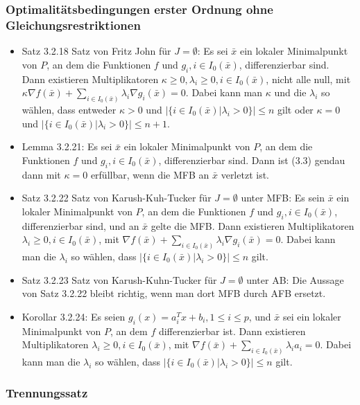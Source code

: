 \documentclass[paper=a4, fontsize=11pt]{scrartcl} %
\numberwithin{equation}{section} %
\numberwithin{figure}{section} %
\numberwithin{table}{section} %
\begin{document}
\subsubsection{Optimalitätsbedingungen erster Ordnung ohne Gleichungsrestriktionen}

\begin{itemize}
  \item Satz 3.2.18 Satz von Fritz John für $J = \emptyset$: Es sei $\bar{x}$ ein lokaler Minimalpunkt von $P$, an dem die Funktionen $f$ und $g_i, i \in I_0(\bar{x})$, differenzierbar sind. Dann existieren Multiplikatoren $\kappa \ge 0, \lambda_i \ge 0, i \in I_0(\bar{x})$, nicht alle null, mit $\kappa \nabla f(\bar{x}) + \sum\limits_{i \in I_0(\bar{x})} \lambda_i \nabla g_i(\bar{x}) = 0$. Dabei kann man $\kappa$ und die $\lambda_i$ so wählen, dass entweder $\kappa > 0$ und $|\{i \in I_0(\bar{x}) | \lambda_i > 0\}| \le n$ gilt oder $\kappa = 0$ und $|\{i \in I_0(\bar{x}) | \lambda_i > 0\}| \le n + 1$.
  \item Lemma 3.2.21: Es sei $\bar{x}$ ein lokaler Minimalpunkt von $P$, an dem die Funktionen $f$ und $g_i, i \in I_0(\bar{x})$, differenzierbar sind. Dann ist (3.3) gendau dann mit $\kappa = 0$ erfüllbar, wenn die MFB an $\bar{x}$ verletzt ist.
  \item Satz 3.2.22 Satz von Karush-Kuh-Tucker für $J = \emptyset$ unter MFB: Es sein $\bar{x}$ ein lokaler Minimalpunkt von $P$, an dem die Funktionen $f$ und $g_i, i \in I_0(\bar{x})$, differenzierbar sind, und an $\bar{x}$ gelte die MFB. Dann existieren Multiplikatoren $\lambda_i \ge 0, i \in I_0(\bar{x})$, mit $\nabla f(\bar{x}) + \sum\limits_{i \in I_0(\bar{x})} \lambda_i \nabla g_i(\bar{x}) = 0$. Dabei kann man die $\lambda_i$ so wählen, dass $|\{i \in I_0(\bar{x})|\lambda_i > 0\}| \le n$ gilt.
  \item Satz 3.2.23 Satz von Karush-Kuhn-Tucker für $J = \emptyset$ unter AB: Die Aussage von Satz 3.2.22 bleibt richtig, wenn man dort MFB durch AFB ersetzt.
  \item Korollar 3.2.24: Es seien $g_i(x) = a^T_i x + b_i, 1 \le i \le p$, und $\bar{x}$ sei ein lokaler Minimalpunkt von $P$, an dem $f$ differenzierbar ist. Dann existieren Multiplikatoren $\lambda_i \ge 0, i \in I_0(\bar{x})$, mit $\nabla f(\bar{x}) + \sum\limits_{i \in I_0(\bar{x})} \lambda_i a_i = 0$. Dabei kann man die $\lambda_i$ so wählen, dass $|\{i \in I_0(\bar{x}) | \lambda_i > 0\}| \le n$ gilt.
\end{itemize}

\subsubsection{Trennungssatz}
\end{document}

